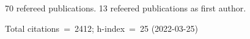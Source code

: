 70 refereed publications. 13 refeered publications as first author.

Total citations~=~2412; h-index~=~25 (2022-03-25)